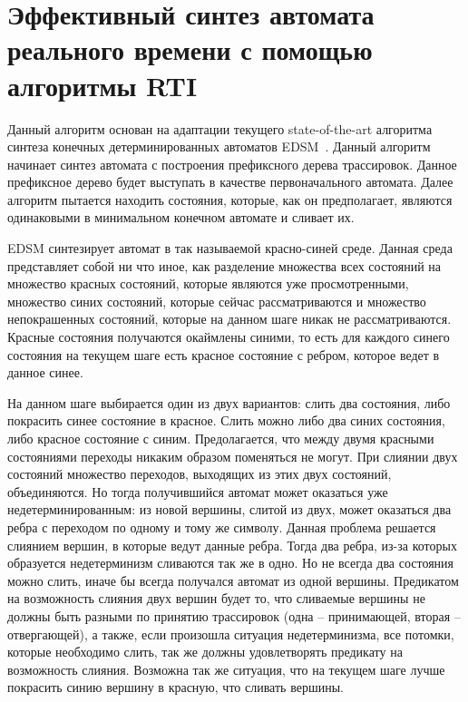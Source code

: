 \documentclass[times,specification,annotation]{itmo-student-thesis}
\begin{document}
\section{Эффективный синтез автомата реального времени с помощью алгоритмы RTI}

Данный алгоритм основан на адаптации текущего state-of-the-art алгоритма синтеза конечных детерминированных автоматов EDSM~\cite{state-merging-dfa}. 
Данный алгоритм начинает синтез автомата с построения префиксного дерева трассировок. Данное префиксное дерево будет выступать в качестве первоначального автомата.
Далее алгоритм пытается находить состояния, которые, как он предполагает, являются одинаковыми в минимальном конечном автомате и сливает их.

EDSM синтезирует автомат в так называемой красно-синей среде. Данная среда представляет собой ни что иное, как разделение множества всех состояний на
множество красных состояний, которые являются уже просмотренными, множество синих состояний, которые сейчас рассматриваются и множество непокрашенных
состояний, которые на данном шаге никак не рассматриваются. Красные состояния получаются окаймлены синими, то есть
для каждого синего состояния на текущем шаге есть красное состояние с ребром, которое ведет в данное синее. 

На данном шаге выбирается один из двух вариантов: слить два состояния, либо покрасить синее состояние в красное. Слить можно либо два синих состояния,
либо красное состояние с синим. Предолагается, что между двумя красными состояниями переходы никаким образом поменяться не могут. При слиянии двух состояний 
множество переходов, выходящих из этих двух состояний, объединяются. Но тогда получившийся автомат может оказаться уже недетерминированным: из новой вершины,
слитой из двух, может оказаться два ребра с переходом по одному и тому же символу. Данная проблема решается слиянием вершин, в которые ведут данные ребра. Тогда
два ребра, из-за которых образуется недетерминизм сливаются так же в одно. Но не всегда два состояния можно слить, иначе бы всегда получался автомат из одной вершины.
Предикатом на возможность слияния двух вершин будет то, что сливаемые вершины не должны быть разными по принятию трассировок (одна -- принимающей, вторая -- отвергающей), а также, 
если произошла ситуация недетерминизма, все потомки, которые необходимо слить, так же должны удовлетворять предикату на возможность слияния.
Возможна так же ситуация, что на текущем шаге лучше покрасить синию вершину в красную, что сливать вершины.
\end{document}
